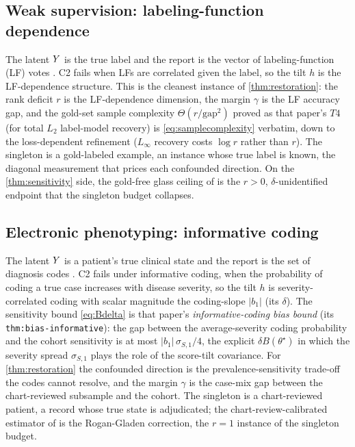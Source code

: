 \subsection{Weak supervision: labeling-function dependence}
\label{sec:inst-weaksup}

The latent $Y$ is the true label and the report is the vector of labeling-function
(LF) votes \citep{towell2026weaksupcoarsening}. C2 fails when LFs are correlated
given the label, so the tilt $h$ is the LF-dependence structure. This is the
cleanest instance of \cref{thm:restoration}: the rank deficit $r$ is the
LF-dependence dimension, the margin $\gamma$ is the LF accuracy gap, and the
gold-set sample complexity $\Theta(r/\mathrm{gap}^2)$ proved as that paper's $T4$
(for total $L_2$ label-model recovery) is \eqref{eq:samplecomplexity} verbatim, down
to the loss-dependent refinement ($L_\infty$ recovery costs $\log r$ rather than
$r$). The singleton is a gold-labeled example, an instance whose true label is known,
the diagonal measurement that prices each confounded direction. On the
\cref{thm:sensitivity} side, the gold-free glass ceiling of
\citet{towell2026weaksupcoarsening} is the $r > 0$, $\delta$-unidentified endpoint
that the singleton budget collapses.

\subsection{Electronic phenotyping: informative coding}
\label{sec:inst-phenotype}

The latent $Y$ is a patient's true clinical state and the report is the set of
diagnosis codes \citep{towell2026phenotypecoarsening}. C2 fails under informative
coding, when the probability of coding a true case increases with disease severity,
so the tilt $h$ is severity-correlated coding with scalar magnitude the coding-slope
$|b_1|$ (its $\delta$). The sensitivity bound \eqref{eq:Bdelta} is that paper's
\emph{informative-coding bias bound} (its \texttt{thm:bias-informative}): the gap
between the average-severity coding probability and the cohort sensitivity is at most
$|b_1|\,\sigma_{S,1}/4$, the explicit $\delta B(\theta^\star)$ in which the severity
spread $\sigma_{S,1}$ plays the role of the score-tilt covariance. For
\cref{thm:restoration} the confounded direction is the prevalence-sensitivity
trade-off the codes cannot resolve, and the margin $\gamma$ is the case-mix gap
between the chart-reviewed subsample and the cohort. The singleton is a
chart-reviewed patient, a record whose true state is adjudicated; the
chart-review-calibrated estimator of \citet{towell2026phenotypecoarsening} is the
Rogan-Gladen correction, the $r = 1$ instance of the singleton budget.
